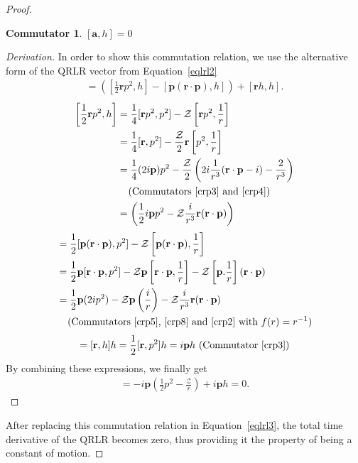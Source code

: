 \documentclass[12pt,a4paper]{report}
\theoremstyle{definition}
\newtheorem{commutator}{Commutator}[section]
\newenvironment{derivation}
  {\renewcommand\qedsymbol{$\square$}\begin{proof}[Derivation]}
  {\end{proof}}
\theoremstyle{remark}
\theoremstyle{remark}
\begin{document}
\begin{proof}
\begin{commutator}
$[\textbf{a},h]=0$
\end{commutator}
\begin{derivation}
In order to show this commutation relation, we use the alternative form of the QRLR vector from Equation~\ref{eqlrl2}
\begin{align*}
[\textbf{a},h]=\left(\left[\frac{1}{2}\textbf{r}p^2,h\right]-[\textbf{p}(\textbf{r}\cdot\textbf{p}),h]\right)+[\textbf{r}h,h].
\end{align*}
\begin{align*}
\left[\frac{1}{2}\textbf{r}p^2,h\right] &= \frac{1}{4}[\textbf{r}p^2,p^2]-\mathcal{Z}\left[\textbf{r}p^2,\frac{1}{r}\right] \\
&= \frac{1}{4}[\textbf{r},p^2]-\frac{\mathcal{Z}}{2}\textbf{r}\left[p^2,\frac{1}{r}\right] \\
&= \frac{1}{4}(2i\textbf{p})p^2-\frac{\mathcal{Z}}{2}\left(2i\frac{1}{r^3}(\textbf{r}\cdot\textbf{p}-i)-\frac{2}{r^3}\right) \\
&\phantom{=} \text{ (Commutators~\ref{crp3} and~\ref{crp4})} \\
&= \left(\frac{1}{2}i\textbf{p}p^2-\mathcal{Z}\frac{i}{r^3}\textbf{r}(\textbf{r}\cdot\textbf{p})\right)
\end{align*}
\begin{align*}
[\textbf{p}(\textbf{r}\cdot\textbf{p}),h] &= \frac{1}{2}[\textbf{p}(\textbf{r}\cdot\textbf{p}),p^2]-\mathcal{Z}\left[\textbf{p}(\textbf{r}\cdot\textbf{p}),\frac{1}{r}\right]\\
&= \frac{1}{2}\textbf{p}[\textbf{r}\cdot\textbf{p},p^2]-\mathcal{Z}\textbf{p}\left[\textbf{r}\cdot\textbf{p},\frac{1}{r}\right]-\mathcal{Z}\left[\textbf{p}.\frac{1}{r}\right](\textbf{r}\cdot\textbf{p}) \\
&= \frac{1}{2}\textbf{p}(2i p^2)-\mathcal{Z}\textbf{p}\left(\frac{i}{r}\right)-\mathcal{Z}\frac{i}{r^3}\textbf{r}(\textbf{r}\cdot\textbf{p}) \\ 
&\phantom{=} \text{ (Commutators~\ref{crp5},~\ref{crp8} and~\ref{crp2} with }f(r)=r^{-1})
\end{align*}
\begin{align*}
[\textbf{r}h,h] = [\textbf{r},h]h=\frac{1}{2}[\textbf{r},p^2]h 
= i\textbf{p}h \text{ (Commutator~\ref{crp3})}
\end{align*} \indent
By combining these expressions, we finally get
\begin{align*}
[\textbf{a},h] = -i\textbf{p}\left(\frac{1}{2}p^2-\frac{\mathcal{Z}}{r}\right)+i\textbf{p}h=0.
\end{align*}
\end{derivation}
After replacing this commutation relation in Equation~\ref{eqlrl3}, the total time derivative of the QRLR becomes zero, thus providing it the property of being a constant of motion.
\end{proof}
\end{document}
